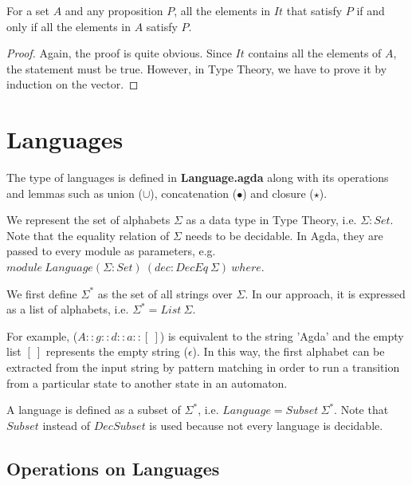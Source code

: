 \begin{lem}
\noindent For a set \(A\) and any proposition \(P\), all
the elements in \(It\) that satisfy \(P\) if and only if all the 
elements in \(A\) satisfy \(P\). 
\end{lem}

\begin{proof}
\noindent Again, the proof is quite obvious. Since \(It\) contains all the
elements of \(A\), the statement must be true. However, in Type
Theory, we have to prove it by induction on the vector.
\end{proof}


\section{Languages}
\par The type of languages is defined in \textbf{Language.agda} along with its 
operations and lemmas such as union (\(\cup\)), concatenation
(\(\bullet\)) and closure (\(\star\)). 

\par We represent the set of alphabets \(\Sigma\) as a data type in
Type Theory, i.e. \(\Sigma : Set\). Note that the equality relation of \(\Sigma\) needs to be
decidable. In Agda, they are passed to every module as
parameters, e.g. \(module\ Language (\Sigma : Set)\ (dec : DecEq\
\Sigma)\ where\). 

\begin{defn}
\noindent We first define \(\Sigma^*\) as the set of all
strings over \(\Sigma\). In our approach, it is expressed as a list of
alphabets, i.e. \(\Sigma^* = List\ \Sigma\). 
\end{defn}

\par For example, (\(A :: g :: d :: a :: [\ ]\)) is equivalent to the
string 'Agda' and the empty list \([\ ]\)
represents the empty string (\(\epsilon\)). In this way, the first
alphabet can be extracted from the input string by pattern matching in order to
run a transition from a particular state to another state in an automaton. 

\begin{defn}
\noindent A language is defined as a subset of 
\(\Sigma^*\), i.e. \(Language = Subset\ \Sigma^*\). 
Note that \(Subset\) instead of \(DecSubset\) is used because not
every language is decidable. 
\end{defn}


\subsection{Operations on Languages}

